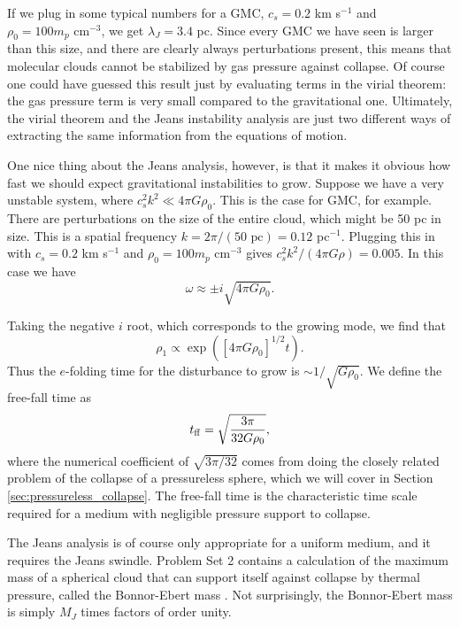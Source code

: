 If we plug in some typical numbers for a GMC, $c_s=0.2$ km s$^{-1}$ and $\rho_0 = 100 m_p\mbox{ cm}^{-3}$, we get $\lambda_J = 3.4$ pc. Since every GMC we have seen is larger than this size, and there are clearly always perturbations present, this means that molecular clouds cannot be stabilized by gas pressure against collapse. Of course one could have guessed this result just by evaluating terms in the virial theorem: the gas pressure term is very small compared to the gravitational one. Ultimately, the virial theorem and the Jeans instability analysis are just two different ways of extracting the same information from the equations of motion.

One nice thing about the Jeans analysis, however, is that it makes it obvious how fast we should expect gravitational instabilities to grow. Suppose we have a very unstable system, where $c_s^2 k^2 \ll 4 \pi G \rho_0$. This is the case for GMC, for example. There are perturbations on the size of the entire cloud, which might be 50 pc in size. This is a spatial frequency $k=2\pi/(50\mbox{ pc}) = 0.12$ pc$^{-1}$. Plugging this in with $c_s = 0.2$ km s$^{-1}$ and $\rho_0=100 m_p\mbox{ cm}^{-3}$ gives $c_s^2 k^2 / (4\pi G \rho) = 0.005$.
In this case we have
\begin{equation}
\omega \approx \pm i \sqrt{4\pi G\rho_0}.
\end{equation}

Taking the negative $i$ root, which corresponds to the growing mode, we find that
\begin{equation}
\rho_1 \propto \exp([4\pi G \rho_0]^{1/2} t).
\end{equation}
Thus the $e$-folding time for the disturbance to grow is $\sim 1/\sqrt{G\rho_0}$. We define the free-fall time as
\begin{equation}
t_{\rm ff} = \sqrt{\frac{3\pi}{32 G \rho_0}},
\end{equation}
where the numerical coefficient of $\sqrt{3\pi/32}$ comes from doing the closely related problem of the collapse of a pressureless sphere, which we will cover in Section \ref{sec:pressureless_collapse}. The free-fall time is the characteristic time scale required for a medium with negligible pressure support to collapse.

The Jeans analysis is of course only appropriate for a uniform medium, and it requires the Jeans swindle. Problem Set 2 contains a calculation of the maximum mass of a spherical cloud that can support itself against collapse by thermal pressure, called the Bonnor-Ebert mass \citep{ebert55a, bonnor56a}. Not surprisingly, the Bonnor-Ebert mass is simply $M_J$ times factors of order unity.

